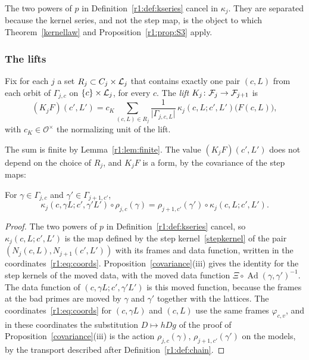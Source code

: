 The two powers of $p$ in Definition~\ref{r1:def:kseries} cancel in $\kappa_j$. They are separated because the kernel series, and not the step map, is the object to which Theorem~\ref{kernellaw} and Proposition~\ref{r1:prop:S3} apply.

\subsubsection{The lifts}

\begin{definition}\label{r1:def:lift}
Fix for each $j$ a set $R_j\subset C_j\times\mathcal L_j$ that contains exactly one pair $(c,L)$ from each orbit of $\Gamma_{j,c}$ on $\{c\}\times\mathcal L_j$, for every $c$. The \emph{lift} $K_j\colon\mathcal F_j\to\mathcal F_{j+1}$ is
\[
(K_jF)(c',L')=c_K\sum_{(c,L)\in R_j}\frac1{\lvert\Gamma_{j,c,L}\rvert}\,\kappa_j(c,L;c',L')\big(F(c,L)\big),
\]
with $c_K\in\mathcal O^\times$ the normalizing unit of the lift.
\end{definition}

The sum is finite by Lemma~\ref{r1:lem:finite}. The value $(K_jF)(c',L')$ does not depend on the choice of $R_j$, and $K_jF$ is a form, by the covariance of the step maps:

\begin{lemma}[Covariance]\label{r1:lem:S2}
For $\gamma\in\Gamma_{j,c}$ and $\gamma'\in\Gamma_{j+1,c'}$,
\[
\kappa_j(c,\gamma L;c',\gamma'L')\circ\rho_{j,c}(\gamma)=\rho_{j+1,c'}(\gamma')\circ\kappa_j(c,L;c',L').
\]
\end{lemma}

\begin{proof}
The two powers of $p$ in Definition~\ref{r1:def:kseries} cancel, so $\kappa_j(c,L;c',L')$ is the map defined by the step kernel~\eqref{stepkernel} of the pair $(N_j(c,L),N_{j+1}(c',L'))$ with its frames and data function, written in the coordinates~\eqref{r1:eq:coords}. Proposition~\ref{covariance}(iii) gives the identity for the step kernels of the moved data, with the moved data function $\Xi\circ\operatorname{Ad}(\gamma,\gamma')^{-1}$. The data function of $(c,\gamma L;c',\gamma'L')$ is this moved function, because the frames at the bad primes are moved by $\gamma$ and $\gamma'$ together with the lattices. The coordinates~\eqref{r1:eq:coords} for $(c,\gamma L)$ and $(c,L)$ use the same frames $\varphi_{c,v}$, and in these coordinates the substitution $D\mapsto hDg$ of the proof of Proposition~\ref{covariance}(iii) is the action $\rho_{j,c}(\gamma)$, $\rho_{j+1,c'}(\gamma')$ on the models, by the transport described after Definition~\ref{r1:def:chain}.
\end{proof}

